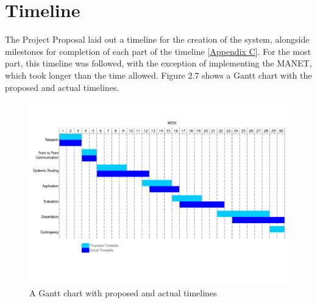 \documentclass[12pt,a4paper]{report}
\begin{document}
\section{Timeline}
The Project Proposal laid out a timeline for the creation of the system, alongside milestones for completion of each part of the timeline [\hyperref[appendixC]{Appendix C}]. For the most part, this timeline was followed, with the exception of implementing the MANET, which took longer than the time allowed. Figure 2.7 shows a Gantt chart with the proposed and actual timelines.
\begin{figure}[h]
\begin{center}
\includegraphics[scale=0.55]{gantt.pdf}
\end{center}
\caption{A Gantt chart with proposed and actual timelines}
\end{figure}
\end{document}
